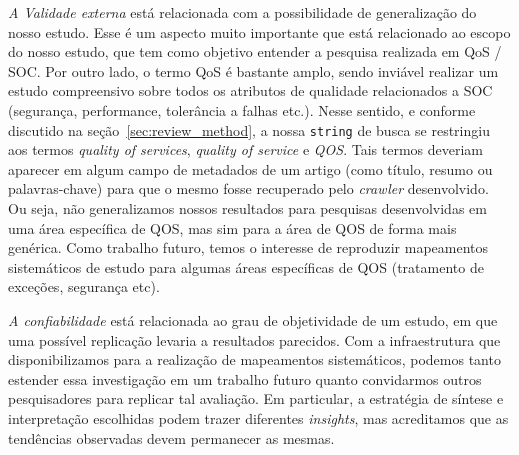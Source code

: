 \noindent
\emph{A Validade externa} est\'{a} relacionada com a possibilidade de
generaliza\c c\~{a}o do nosso estudo. Esse \'{e} um aspecto muito
importante que est\'{a} relacionado ao escopo do nosso estudo, que tem
como objetivo entender a pesquisa realizada em QoS / SOC. Por outro
lado, o termo QoS \'{e} bastante amplo, sendo invi\'{a}vel realizar
um estudo compreensivo sobre todos os atributos de qualidade
relacionados a SOC (seguran\c ca, performance, toler\^{a}ncia a falhas
etc.). Nesse sentido, e conforme discutido na se\c{c}\~{a}o~\ref{sec:review_method}, a nossa \texttt{string} de busca se restringiu aos termos \emph{quality of services}, \emph{quality of service} e \emph{QOS}. Tais termos deveriam aparecer em algum campo de metadados de um artigo (como t\'{i}tulo, resumo ou palavras-chave) para que o mesmo fosse recuperado pelo \emph{crawler} desenvolvido. Ou seja, n\~{a}o generalizamos nossos resultados para pesquisas desenvolvidas em uma \'{a}rea espec\'{i}fica de QOS, mas sim para a \'{a}rea de QOS de forma mais gen\'{e}rica. Como
trabalho futuro, temos o interesse de reproduzir mapeamentos sistem\'{a}ticos de estudo para algumas \'{a}reas espec\'{i}ficas de QOS (tratamento de exce\c
c\~{o}es, seguran\c ca etc). 

\noindent
\emph{A confiabilidade} est\'{a} relacionada ao grau de objetividade de
um estudo, em que uma poss\'{i}vel replica\c c\~{a}o levaria a
resultados parecidos. Com a infraestrutura que disponibilizamos para a realiza\c{c}\~{a}o de mapeamentos sistem\'{a}ticos, podemos tanto estender essa investiga\c c\~{a}o em um trabalho futuro quanto convidarmos outros pesquisadores para replicar tal avalia\c c\~{a}o. Em particular, a estrat\'{e}gia de s\'{i}ntese e interpreta\c{c}\~{a}o escolhidas podem trazer diferentes \emph{insights}, mas acreditamos que as tend\^{e}ncias observadas devem permanecer as mesmas.
